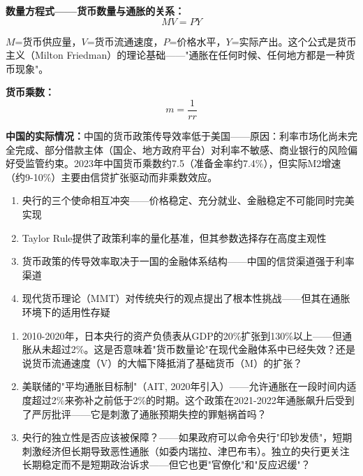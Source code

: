 \documentclass[a4paper,11pt]{ctexbook}
\begin{document}
{\begin{lessonsummary}
\begin{quantitative}
\textbf{数量方程式——货币数量与通胀的关系：}
\[
MV = PY
\]

$M$=货币供应量，$V$=货币流通速度，$P$=价格水平，$Y$=实际产出。这个公式是货币主义（Milton Friedman）的理论基础——"通胀在任何时候、任何地方都是一种货币现象"。

\textbf{货币乘数：}
\[
m = \frac{1}{rr}
\]

\textbf{中国的实际情况：}中国的货币政策传导效率低于美国——原因：利率市场化尚未完全完成、部分借款主体（国企、地方政府平台）对利率不敏感、商业银行的风险偏好受监管约束。2023年中国货币乘数约7.5（准备金率约7.4\%），但实际M2增速（约9-10\%）主要由信贷扩张驱动而非乘数效应。
\end{quantitative}

\begin{lessonsummary}
\begin{enumerate}
  \item 央行的三个使命相互冲突——价格稳定、充分就业、金融稳定不可能同时完美实现
  \item Taylor Rule提供了政策利率的量化基准，但其参数选择存在高度主观性
  \item 货币政策的传导效率取决于一国的金融体系结构——中国的信贷渠道强于利率渠道
  \item 现代货币理论（MMT）对传统央行的观点提出了根本性挑战——但其在通胀环境下的适用性存疑
\end{enumerate}
\end{lessonsummary}

\begin{discuss}
\begin{enumerate}
  \item 2010-2020年，日本央行的资产负债表从GDP的20\%扩张到130\%以上——但通胀从未超过2\%。这是否意味着"货币数量论"在现代金融体系中已经失效？还是说货币流通速度（V）的大幅下降抵消了基础货币（M）的扩张？
  \item 美联储的"平均通胀目标制"（AIT, 2020年引入）——允许通胀在一段时间内适度超过2\%来弥补之前低于2\%的时期。这个政策在2021-2022年通胀飙升后受到了严厉批评——它是刺激了通胀预期失控的罪魁祸首吗？
  \item 央行的独立性是否应该被保障？——如果政府可以命令央行"印钞发债"，短期刺激经济但长期导致恶性通胀（如委内瑞拉、津巴布韦）。独立的央行更关注长期稳定而不是短期政治诉求——但它也更"官僚化"和"反应迟缓"？
\end{enumerate}
\end{discuss}


\end{lessonsummary}}
\end{document}
